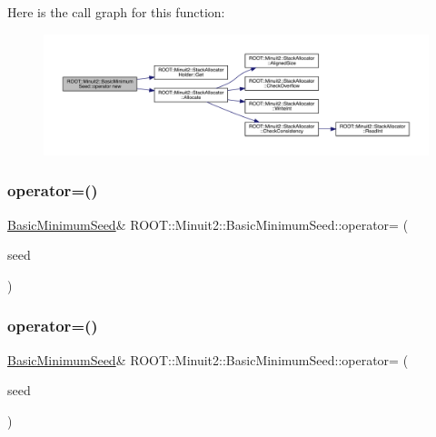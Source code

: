 Here is the call graph for this function\+:
\nopagebreak
\begin{figure}[H]
\begin{center}
\leavevmode
\includegraphics[width=350pt]{de/d50/classROOT_1_1Minuit2_1_1BasicMinimumSeed_ae9ee17ec0140aa209e488b064675f3c3_cgraph}
\end{center}
\end{figure}
\mbox{\label{classROOT_1_1Minuit2_1_1BasicMinimumSeed_aeffefca123cbfd95d19fa7fb7e087431}} 
\subsubsection{\texorpdfstring{operator=()}{operator=()}\hspace{0.1cm}{\footnotesize\ttfamily [1/3]}}
{\footnotesize\ttfamily \mbox{\hyperlink{classROOT_1_1Minuit2_1_1BasicMinimumSeed}{Basic\+Minimum\+Seed}}\& R\+O\+O\+T\+::\+Minuit2\+::\+Basic\+Minimum\+Seed\+::operator= (\begin{DoxyParamCaption}\item[{const \mbox{\hyperlink{classROOT_1_1Minuit2_1_1BasicMinimumSeed}{Basic\+Minimum\+Seed}} \&}]{seed }\end{DoxyParamCaption})\hspace{0.3cm}{\ttfamily [inline]}}

\mbox{\label{classROOT_1_1Minuit2_1_1BasicMinimumSeed_aeffefca123cbfd95d19fa7fb7e087431}} 
\subsubsection{\texorpdfstring{operator=()}{operator=()}\hspace{0.1cm}{\footnotesize\ttfamily [2/3]}}
{\footnotesize\ttfamily \mbox{\hyperlink{classROOT_1_1Minuit2_1_1BasicMinimumSeed}{Basic\+Minimum\+Seed}}\& R\+O\+O\+T\+::\+Minuit2\+::\+Basic\+Minimum\+Seed\+::operator= (\begin{DoxyParamCaption}\item[{const \mbox{\hyperlink{classROOT_1_1Minuit2_1_1BasicMinimumSeed}{Basic\+Minimum\+Seed}} \&}]{seed }\end{DoxyParamCaption})\hspace{0.3cm}{\ttfamily [inline]}}


